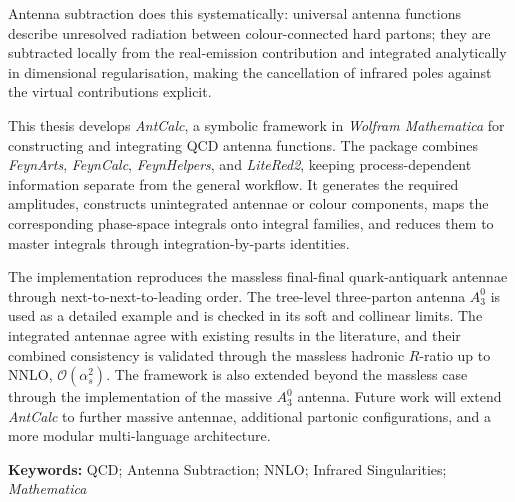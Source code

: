 Antenna subtraction does this systematically: universal antenna functions describe
unresolved radiation between colour-connected hard partons; they are subtracted locally
from the real-emission contribution and integrated analytically in dimensional
regularisation, making the cancellation of infrared poles against the virtual
contributions explicit.

This thesis develops \textit{AntCalc}, a symbolic framework in \textit{Wolfram Mathematica} 
for constructing and integrating QCD antenna functions. The package combines 
\textit{FeynArts}, \textit{FeynCalc}, \textit{FeynHelpers}, and \textit{LiteRed2}, 
keeping process-dependent
information separate from the general workflow. It generates the required 
amplitudes, constructs unintegrated antennae or colour components, maps the 
corresponding phase-space integrals onto integral families, and reduces them to 
master integrals through integration-by-parts identities.

The implementation reproduces the massless final-final quark-antiquark antennae 
through next-to-next-to-leading order. The tree-level three-parton antenna \(A_3^0\) 
is used as a detailed example and is checked in its soft and collinear limits. The
integrated antennae agree with existing results in the literature, and their
combined consistency is validated through the massless hadronic \(R\)-ratio up
to NNLO, \(\mathcal{O}(\alpha_s^2)\).
The framework is also extended beyond the massless case through the implementation
of the massive \(A_3^0\) antenna. Future work will extend \textit{AntCalc} to further massive antennae,
additional partonic configurations, and a more modular multi-language architecture.

\vspace{1cm}
\noindent\textbf{Keywords:} QCD; Antenna Subtraction; NNLO; Infrared Singularities; \textit{Mathematica}

